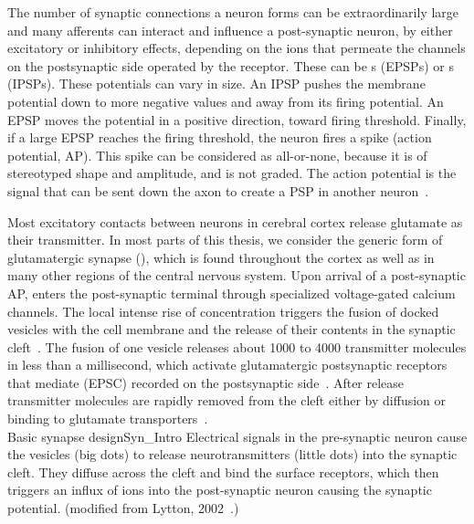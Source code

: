 The number of synaptic connections a neuron forms can be
extraordinarily large and many afferents can interact and influence a
post-synaptic neuron, by either excitatory or inhibitory effects,
depending on the ions that permeate the channels on the postsynaptic
side operated by the receptor. These can be {\epsp}s (EPSPs) or
{\ipsp}s (IPSPs). These potentials can vary in size. An IPSP pushes
the membrane potential down to more negative values and away from its
firing potential. An EPSP moves the potential in a positive direction,
toward firing threshold. Finally, if a large EPSP reaches the firing
threshold, the neuron fires a spike (action potential, AP). This
spike can be considered as all-or-none, because it is of stereotyped
shape and amplitude, and is not graded. The action potential is the
signal that can be sent down the axon to create a PSP in another
neuron~\cite{Lyn02}.\\


Most excitatory contacts between neurons in cerebral cortex release
glutamate as their transmitter. In most parts of this thesis, we
consider the generic form of glutamatergic synapse
(), which is found throughout the cortex as well as
in many other regions of the central nervous system.  Upon arrival of
a post-synaptic AP, {\ca} enters the post-synaptic terminal through
specialized voltage-gated calcium channels. The local intense rise of
{\ca} concentration triggers the fusion of docked vesicles with the
cell membrane and the release of their contents in the synaptic 
cleft~\cite{Edw95}.  The fusion of one vesicle releases about 
1000 to 4000 transmitter molecules in less than a millisecond, 
which activate glutamatergic postsynaptic receptors that mediate 
{\epsp} (EPSC) recorded on the postsynaptic side~\cite{Clm96,
Edw95}. After release transmitter molecules are rapidly removed 
from the cleft either by diffusion or binding to glutamate
transporters~\cite{Dim97, Rsk98}. \\


{Basic synapse design}{Syn_Intro}
{Electrical signals in the pre-synaptic neuron cause the vesicles 
(big dots) to release neurotransmitters (little dots) into the 
synaptic cleft. They diffuse across the cleft and bind the surface 
receptors, which then triggers an influx of ions into the 
post-synaptic neuron causing the synaptic potential. (modified from 
Lytton, 2002~\cite{Lyn02}.)}


